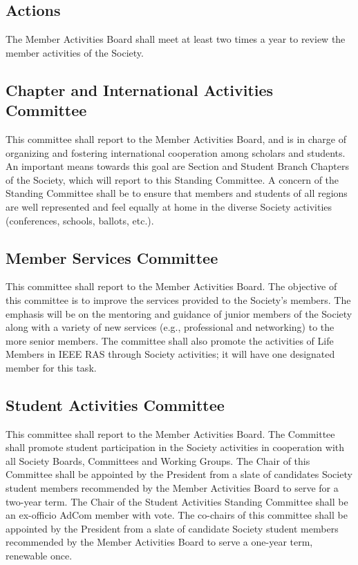 \documentclass[10pt]{article}
\begin{document}
\subsection{Actions}
The Member Activities Board shall meet at least two times a year to review the member activities of the Society.


\subsection{Chapter and International Activities Committee}

This committee shall report to the Member Activities Board, and is in charge of organizing and fostering international cooperation among scholars and students. An important means towards this goal are Section and Student Branch Chapters of the Society, which will report to this Standing Committee.  A concern of the Standing Committee shall be to ensure that members and students of all regions are well represented and feel equally at home in the diverse Society activities (conferences, schools, ballots, etc.).



\subsection{Member Services Committee}
This committee shall report to the Member Activities Board. The objective of this committee is to improve the services provided to the Society's members. The emphasis will be on the mentoring and guidance of junior members of the Society along with a variety of new services (e.g., professional and networking) to the more senior members. The committee shall also promote the activities of Life Members in IEEE RAS through Society activities; it will have one designated member for this task. %


\subsection{Student Activities Committee}

This committee shall report to the Member Activities Board. The Committee shall promote student participation in the Society activities in cooperation with all Society Boards, Committees and Working Groups. The Chair of this Committee shall be appointed by the President from a slate of candidates Society student members recommended by the Member Activities Board to serve for a two-year term. The Chair of the Student Activities Standing Committee shall be an ex-officio AdCom member with vote. The co-chairs of this committee shall be appointed by the President from a slate of candidate Society student members recommended by the Member Activities Board to serve a one-year term, renewable once.
\end{document}
